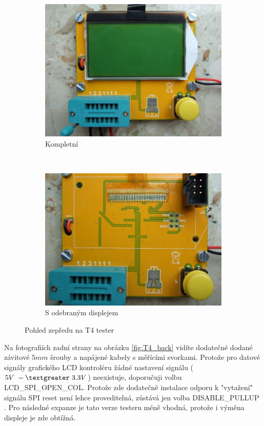 \begin{figure}[H]
  \begin{subfigure}[b]{.5\textwidth}
    \centering
    \includegraphics[width=1.\textwidth]{../PNG/T4_front.JPG}
    \caption{Kompletní}
  \end{subfigure}
  ~
  \begin{subfigure}[b]{.5\textwidth}
    \centering
    \includegraphics[width=1.\textwidth]{../PNG/T4_front_noLCD.JPG}
    \caption{S odebraným displejem}
  \end{subfigure}
  \caption{Pohled zepředu na T4 tester}
  \label{fig:T4_front}
\end{figure}

Na fotografiích zadní strany na obrázku \ref{fig:T4_back} vidíte dodatečné dodané
závitové \(5mm\) šrouby a napájené kabely s měřícími svorkami.
Protože pro datové signály grafického LCD kontroléru žádné nastavení
signálu (\(5V~-\textgreater ~3.3V\)) neexistuje, doporučuji volbu LCD\_SPI\_OPEN\_COL.
Protože zde dodatečně instalace  odporu k "vytažení" signálu SPI reset
není lehce proveditelná, zůstává jen volba DISABLE\_PULLUP . 
Pro následné expanze je tato verze testeru méně vhodná, protože i výměna displeje je zde obtížná.

